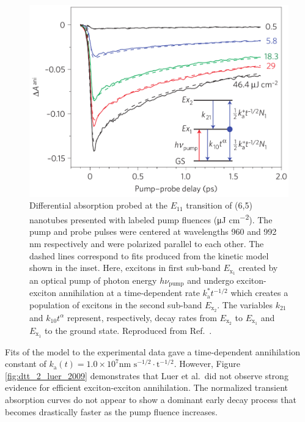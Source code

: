\begin{figure}[H]
	\centering
	\includegraphics[scale=1.2]{images/chapter_prior_works/dtt_2_luer_2009}
	\caption{Differential absorption probed at the $E_{11}$ transition of (6,5) nanotubes presented with labeled pump fluences (\si{\micro \joule} \si{\cm^{-2}}). The pump and probe pulses were centered at wavelengths 960 and 992 nm respectively and were polarized parallel to each other. The dashed lines correspond to fits produced from the kinetic model shown in the inset. Here, excitons in first sub-band $E_{\text{x}_1}$ created by an optical pump of photon energy $h \nu_\text{pump}$ and undergo exciton-exciton annihilation at a time-dependent rate $k_\text{a}^* t^{-1/2}$ which creates a population of excitons in the second sub-band $E_{\text{x}_2}$. The variables $k_{21}$ and $k_{10}t^{\alpha}$ represent, respectively, decay rates from $E_{\text{x}_2}$ to $E_{\text{x}_1}$ and $E_{\text{x}_1}$ to the ground state. Reproduced from Ref.\ \cite{luer2009size}.}
	\label{fig:dtt_luer_2009}
\end{figure}


Fits of the model to the experimental data gave a time-dependent annihilation constant of $k_\text{a}(t) = 1.0 \times 10^7 \text{nm } \text{s}^{-1/2} \cdot \text{t}^{-1/2}$. However, Figure \ref{fig:dtt_2_luer_2009} demonstrates that Luer et al.\ did not observe strong evidence for efficient exciton-exciton annihilation. The normalized transient absorption curves do not appear to show a dominant early decay process that becomes drastically faster as the pump fluence increases.

